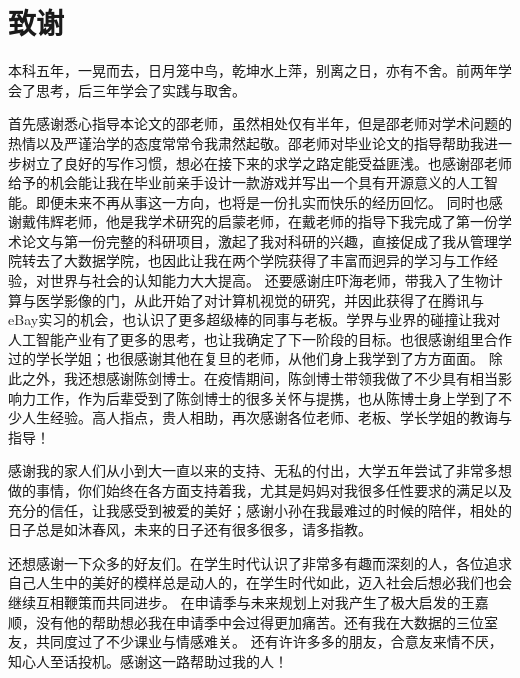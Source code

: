 \chapter*{致谢}
本科五年，一晃而去，日月笼中鸟，乾坤水上萍，别离之日，亦有不舍。前两年学会了思考，后三年学会了实践与取舍。

首先感谢悉心指导本论文的邵老师，虽然相处仅有半年，但是邵老师对学术问题的热情以及严谨治学的态度常常令我肃然起敬。邵老师对毕业论文的指导帮助我进一步树立了良好的写作习惯，想必在接下来的求学之路定能受益匪浅。也感谢邵老师给予的机会能让我在毕业前亲手设计一款游戏并写出一个具有开源意义的人工智能。即便未来不再从事这一方向，也将是一份扎实而快乐的经历回忆。
同时也感谢戴伟辉老师，他是我学术研究的启蒙老师，在戴老师的指导下我完成了第一份学术论文与第一份完整的科研项目，激起了我对科研的兴趣，直接促成了我从管理学院转去了大数据学院，也因此让我在两个学院获得了丰富而迥异的学习与工作经验，对世界与社会的认知能力大大提高。
还要感谢庄吓海老师，带我入了生物计算与医学影像的门，从此开始了对计算机视觉的研究，并因此获得了在腾讯与eBay实习的机会，也认识了更多超级棒的同事与老板。学界与业界的碰撞让我对人工智能产业有了更多的思考，也让我确定了下一阶段的目标。也很感谢组里合作过的学长学姐；也很感谢其他在复旦的老师，从他们身上我学到了方方面面。
除此之外，我还想感谢陈剑博士。在疫情期间，陈剑博士带领我做了不少具有相当影响力工作，作为后辈受到了陈剑博士的很多关怀与提携，也从陈博士身上学到了不少人生经验。高人指点，贵人相助，再次感谢各位老师、老板、学长学姐的教诲与指导！

感谢我的家人们从小到大一直以来的支持、无私的付出，大学五年尝试了非常多想做的事情，你们始终在各方面支持着我，尤其是妈妈对我很多任性要求的满足以及充分的信任，让我感受到被爱的美好；感谢小孙在我最难过的时候的陪伴，相处的日子总是如沐春风，未来的日子还有很多很多，请多指教。

还想感谢一下众多的好友们。在学生时代认识了非常多有趣而深刻的人，各位追求自己人生中的美好的模样总是动人的，在学生时代如此，迈入社会后想必我们也会继续互相鞭策而共同进步。
在申请季与未来规划上对我产生了极大启发的王嘉顺，没有他的帮助想必我在申请季中会过得更加痛苦。还有我在大数据的三位室友，共同度过了不少课业与情感难关。
还有许许多多的朋友，合意友来情不厌，知心人至话投机。感谢这一路帮助过我的人！
